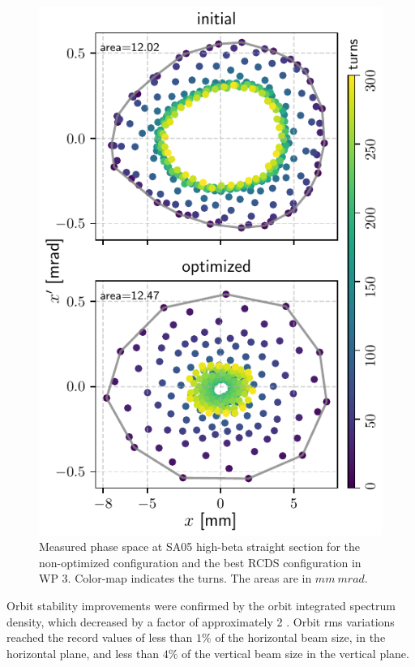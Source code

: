 \begin{figure}[htb]
\begin{minipage}{0.48\textwidth}
        \includegraphics[width=\textwidth]{Images/wp3_phase_space.pdf}
        \caption{Measured phase space at SA05 high-beta straight section for the non-optimized configuration and the best RCDS configuration in WP 3. Color-map indicates the turns. The areas are in $\unit{mm}~\unit{mrad}$.}
    \end{minipage}
\end{figure}

Orbit stability improvements were confirmed by the orbit integrated spectrum density, which decreased by a factor of approximately 2 \cite{Liu:IPAC23-WEOGA2}. Orbit rms variations reached the record values of less than $1\%$ of the horizontal beam size, in the horizontal plane, and less than $4\%$ of the vertical beam size in the vertical plane.

